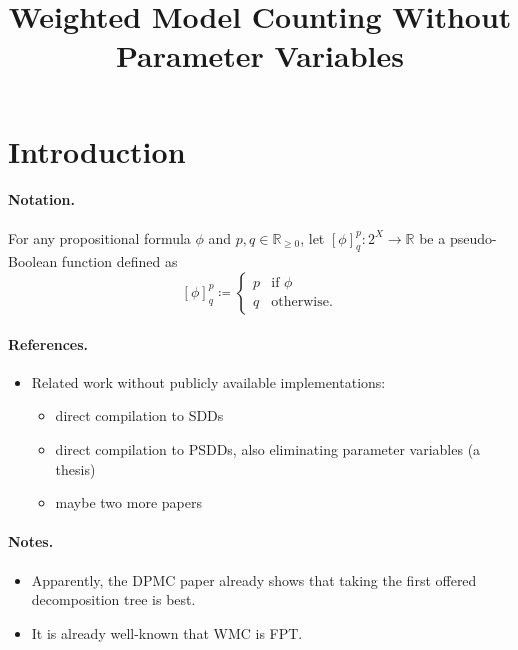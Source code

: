 \documentclass{article}
\title{Weighted Model Counting Without Parameter Variables}
\theoremstyle{definition}
\theoremstyle{remark}
\begin{document}
\maketitle

\section{Introduction}

\paragraph{Notation.} For any propositional formula $\phi$ and $p, q \in
\mathbb{R}_{\ge 0}$, let $[\phi]^p_q\colon 2^X \to \mathbb{R}$ be a
pseudo-Boolean function defined as
\[
  [\phi]^p_q \coloneqq
  \begin{cases}
    p & \text{if } \phi \\
    q & \text{otherwise.}
  \end{cases}
\]

\paragraph{References.}
\begin{itemize}
\item Related work without publicly available implementations:
  \begin{itemize}
  \item direct compilation to SDDs \cite{DBLP:conf/ecsqaru/ChoiKD13}
  \item direct compilation to PSDDs, also eliminating parameter variables (a thesis)
  \item maybe two more papers
  \end{itemize}
\end{itemize}

\paragraph{Notes.}
\begin{itemize}
\item Apparently, the DPMC paper already shows that taking the first offered
  decomposition tree is best.
\item It is already well-known that WMC is FPT.
\end{itemize}
\end{document}
